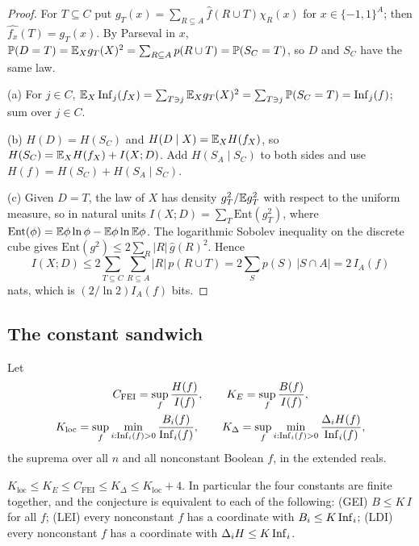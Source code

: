 \begin{proof}
For $T\subseteq C$ put $g_T(x)=\sum_{R\subseteq A}\hat f(R\cup T)\chi_R(x)$ for $x\in\{-1,1\}^A$; then $\widehat{f_x}(T)=g_T(x)$. By Parseval in $x$, $\mathbb{P}(D=T)=\mathbb{E}_Xg_T(X)^2=\sum_{R\subseteq A}p(R\cup T)=\mathbb{P}(S_C=T)$, so $D$ and $S_C$ have the same law.

(a) For $j\in C$, $\mathbb{E}_X\operatorname{Inf}_j(f_X)=\sum_{T\ni j}\mathbb{E}_Xg_T(X)^2=\sum_{T\ni j}\mathbb{P}(S_C=T)=\operatorname{Inf}_j(f)$; sum over $j\in C$.

(b) $H(D)=H(S_C)$ and $H(D\mid X)=\mathbb{E}_XH(f_X)$, so $H(S_C)=\mathbb{E}_XH(f_X)+I(X;D)$. Add $H(S_A\mid S_C)$ to both sides and use $H(f)=H(S_C)+H(S_A\mid S_C)$.

(c) Given $D=T$, the law of $X$ has density $g_T^2/\mathbb{E} g_T^2$ with respect to the uniform measure, so in natural units $I(X;D)=\sum_T\mathrm{Ent}(g_T^2)$, where $\mathrm{Ent}(\phi)=\mathbb{E}\phi\ln\phi-\mathbb{E}\phi\ln\mathbb{E}\phi$. The logarithmic Sobolev inequality on the discrete cube \cite{Gross1975} gives $\mathrm{Ent}(g^2)\le2\sum_R|R|\,\hat g(R)^2$. Hence
\[
I(X;D)\le2\sum_{T\subseteq C}\sum_{R\subseteq A}|R|\,p(R\cup T)=2\sum_Sp(S)\,|S\cap A|=2\,I_A(f)
\]
nats, which is $(2/\ln2)I_A(f)$ bits.
\end{proof}

\subsection{The constant sandwich}
Let
\begin{gather*}
C_{\mathrm{FEI}}=\sup_f\frac{H(f)}{I(f)},\qquad K_E=\sup_f\frac{B(f)}{I(f)},\\
K_{\mathrm{loc}}=\sup_f\min_{i:\operatorname{Inf}_i(f)>0}\frac{B_i(f)}{\operatorname{Inf}_i(f)},\qquad K_\Delta=\sup_f\min_{i:\operatorname{Inf}_i(f)>0}\frac{\Delta_iH(f)}{\operatorname{Inf}_i(f)},
\end{gather*}
the suprema over all $n$ and all nonconstant Boolean $f$, in the extended reals.

\begin{theorem}\label{thm:sandwich}
$K_{\mathrm{loc}}\le K_E\le C_{\mathrm{FEI}}\le K_\Delta\le K_{\mathrm{loc}}+4$. In particular the four constants are finite together, and the conjecture is equivalent to each of the following: (GEI) $B\le K\,I$ for all $f$; (LEI) every nonconstant $f$ has a coordinate with $B_i\le K\operatorname{Inf}_i$; (LDI) every nonconstant $f$ has a coordinate with $\Delta_iH\le K\operatorname{Inf}_i$.
\end{theorem}


